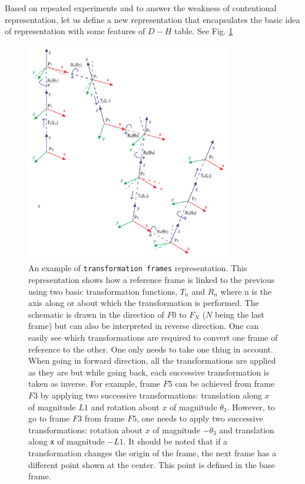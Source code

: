 {{        Based on repeated experiments and to answer the weakness of contentional representation, let us define a new representation that encapsulates the basic idea of representation with some features of $D-H$ table. See Fig. \ref{FigMyRep}
        \begin{figure}
          \centering
          \includegraphics[width=0.8\textwidth]{MyRep.pdf}
          \caption{An example of \texttt{transformation frames} representation. This representation shows how a reference frame is linked to the previous using two basic transformation functions, $T_n$ and $R_n$ where n is the axis along or about which the transformation is performed. The schematic is drawn in the direction of $F0$ to $F_N$ ($N$ being the last frame) but can also be interpreted in reverse direction. One can easily see which transformations are required to convert one frame of reference to the other. One only needs to take one thing in account. When going in forward direction, all the transformations are applied as they are but while going back, each successive transformation is taken as inverse. For example, frame $F5$ can be achieved from frame $F3$ by applying two successive transformations: translation along $x$ of magnitude $L1$ and rotation about $x$ of magnitude $\theta_3$. However, to go to frame $F3$ from frame $F5$, one needs to apply two successive transformations: rotation about $x$ of magnitude $-\theta_3$ and translation along \texttt{x} of magnitude $-L1$. It should be noted that if a transformation changes the origin of the frame, the next frame has a different point shown at the center. This point is defined in the base frame.
          } \label{FigMyRep}
        \end{figure}

}}
